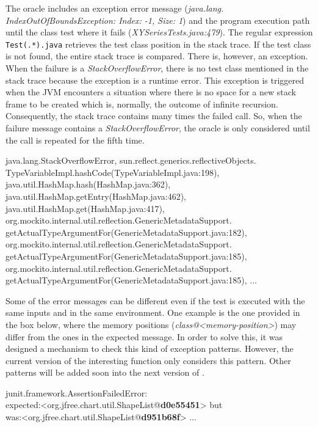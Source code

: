\documentclass[sigplan,10pt,review,anonymous]{acmart}\settopmatter{printfolios=true,printccs=false,printacmref=false}
\begin{document}
The oracle includes an exception error message (\emph{java.lang.\\IndexOutOfBoundsException: Index: -1, Size: 1}) and the program execution path until the class test where it fails (\emph{XYSeriesTests.java:479}). The regular expression \verb/Test(.*).java/ retrieves the test class position in the stack trace. If the test class is not found, the entire stack trace is compared. There is, however, an exception. When the failure is a \emph{StackOverflowError}, there is no test class mentioned in the stack trace because the exception is a runtime error. This exception is triggered when the JVM encounters a situation where there is no space for a new stack frame to be created which is, normally, the outcome of infinite recursion. Consequently, the stack trace contains many times the failed call. So, when the failure message contains a \emph{StackOverflowError}, the oracle is only considered until the call is repeated for the fifth time.

\vspace{3mm}
\begin{myframe}
	java.lang.StackOverflowError,
	sun.reflect.generics.reflectiveObjects.\linebreak
			TypeVariableImpl.hashCode(TypeVariableImpl.java:198),
	java.util.HashMap.hash(HashMap.java:362),
	java.util.HashMap.getEntry(HashMap.java:462),
	java.util.HashMap.get(HashMap.java:417),  org.mockito.internal.util.reflection.GenericMetadataSupport.
		getActualTypeArgumentFor(GenericMetadataSupport.java:182), \linebreak
	org.mockito.internal.util.reflection.GenericMetadataSupport.
	getActualTypeArgumentFor(GenericMetadataSupport.java:185),
	org.mockito.internal.util.reflection.GenericMetadataSupport.
	getActualTypeArgumentFor(GenericMetadataSupport.java:185),
	...
\end{myframe}

Some of the error messages can be different even if the test is executed with the same inputs and in the same environment. One example is the one provided in the box below, where the memory positions (\emph{class@<memory-position>}) may differ from the ones in the expected message. In order to solve this, it was designed a mechanism to check this kind of exception patterns. However, the current version of the interesting function only considers this pattern. Other patterns will be added soon into the next version of \lithium{}.

\vspace{3mm}
\begin{myframe}
	junit.framework.AssertionFailedError: \\
	expected:<org.jfree.chart.util.ShapeList@\textbf{d0e55451}> but \\ was:<org.jfree.chart.util.ShapeList@\textbf{d951b68f}>
	...
\end{myframe}
\end{document}
